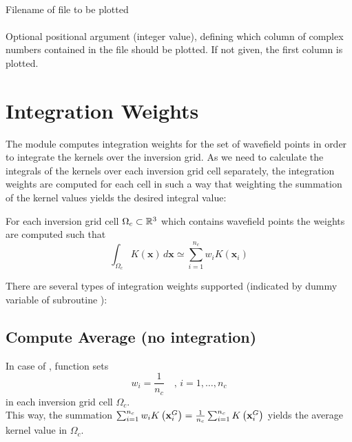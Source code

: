 \paragraph{}
Filename of file to be plotted
\paragraph{}
Optional positional argument (integer value), defining which column of complex numbers contained in
the file should be plotted. If not given, the first column is plotted. 

%
\section{Integration Weights} \label{programs_scripts,sec:fmod_intw}
%
The \ASKI{} module  computes integration weights for the set of wavefield points 
in order to integrate the kernels over the inversion grid. As we need to calculate the integrals of the 
kernels over each inversion grid cell separately, the integration weights are computed for each cell in 
such a way that weighting the summation of the kernel values yields the desired integral value:

For each inversion grid cell $\Omega_c \subset \mathbb{R}^3$ which contains wavefield points \wpG the weights 
\weights are computed such that
\begin{equation} \label{programs_scripts,sec:fmod_intw,eq:integration_global}
\int_{\Omega_c} K(\mathbf{x})\,d\mathbf{x} \simeq \sum_{i=1}^{n_c} w_iK(\mathbf{x}_i)
\end{equation}

There are several types of integration weights supported (indicated by dummy variable  of 
subroutine ):

\setcounter{subsection}{-1}
\subsection{Compute Average (no integration)} \label{programs_scripts,sec:fmod_intw,sub:average}
%
In case of , function  sets 
\[w_i = \frac{1}{n_c} \quad ,\, i=1,\dots,n_c\]
in each inversion grid cell $\Omega_c$.\\
This way, the summation $\sum_{i=1}^{n_c} w_iK\left( \mathbf{x}_i^G \right) = \frac{1}{n_c} \sum_{i=1}^{n_c} 
K\left( \mathbf{x}_i^G \right)$ yields the average kernel value in $\Omega_c$.


